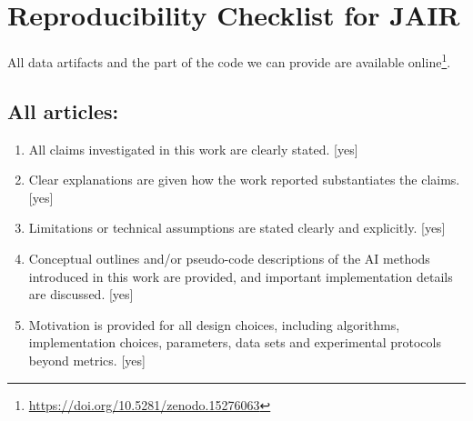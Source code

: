 \documentclass[]{amsart}
\theoremstyle{plain}
\begin{document}

{\small


}
\appendix

\section{Reproducibility Checklist for JAIR}

All data artifacts and the part of the code we can provide are available online\footnote{\url{https://doi.org/10.5281/zenodo.15276063}}.

\subsection*{All articles:}

\begin{enumerate}
    \item All claims investigated in this work are clearly stated. 
    [yes]
    \item Clear explanations are given how the work reported substantiates the claims. 
    [yes]
    \item Limitations or technical assumptions are stated clearly and explicitly. 
    [yes]
    \item Conceptual outlines and/or pseudo-code descriptions of the AI methods introduced in this work are provided, and important implementation details are discussed. 
    [yes]
    \item 
    Motivation is provided for all design choices, including algorithms, implementation choices, parameters, data sets and experimental protocols beyond metrics.
    [yes]
\end{enumerate}
\end{document}
